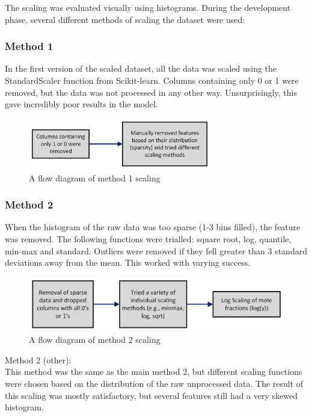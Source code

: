 \documentclass[11pt, titlepage]{article}
\begin{document}
The scaling was evaluated visually using histograms. During the development phase, several different methods of scaling the dataset were used:
\subsubsection{Method 1}
In the first version of the scaled dataset, all the data was scaled using the StandardScaler function from Scikit-learn. Columns containing only 0 or 1 were removed, but the data was not processed in any other way. Unsurprisingly, this gave incredibly poor results in the model.

\begin{figure}[ht]
\centering
\includegraphics[width=8cm]{media/Method1.png}
\caption{A flow diagram of method 1 scaling}
\end{figure}

\subsubsection{Method 2}
When the histogram of the raw data was too sparse (1-3 bins filled), the feature was removed. The following functions were trialled: square root, log, quantile, min-max and standard. Outliers were removed if they fell greater than 3 standard deviations away from the mean. This worked with varying success.

\begin{figure}[ht]
\centering
\includegraphics[width=12cm]{media/Method2.png}
\caption{A flow diagram of method 2 scaling}
\end{figure}

Method 2 (other):\\
This method was the same as the main method 2, but different scaling functions were chosen based on the distribution of the raw unprocessed data. The result of this scaling was mostly satisfactory, but several features still had a very skewed histogram.\\
\end{document}
